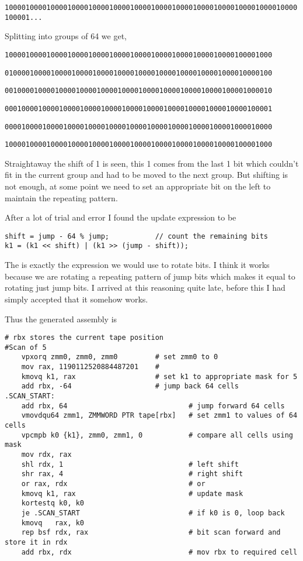 \documentclass[11pt,answers]{exam}
\begin{document}
\texttt{1000010000100001000010000100001000010000100001000010000100001000010000100001...}

\bigskip
Splitting into groups of 64 we get,

\texttt{1000010000100001000010000100001000010000100001000010000100001000}

\texttt{0100001000010000100001000010000100001000010000100001000010000100}

\texttt{0010000100001000010000100001000010000100001000010000100001000010}

\texttt{0001000010000100001000010000100001000010000100001000010000100001}

\texttt{0000100001000010000100001000010000100001000010000100001000010000}

\texttt{1000010000100001000010000100001000010000100001000010000100001000}


\bigskip
Straightaway the shift of 1 is seen, this 1 comes from the last 1 bit which couldn't fit in the current group and had to be moved to the next group. But shifting is not enough, at some point we need to set an appropriate bit on the left to maintain the repeating pattern.

\bigskip
After a lot of trial and error I found the update expression to be
\begin{verbatim}
shift = jump - 64 % jump;           // count the remaining bits
k1 = (k1 << shift) | (k1 >> (jump - shift));
\end{verbatim}

The is exactly the expression we would use to rotate bits. I think it works because we are rotating a repeating pattern of jump bits which makes it equal to rotating just jump bits. I arrived at this reasoning quite late, before this I had simply accepted that it somehow works.

Thus the generated assembly is
	{\renewcommand\fcolorbox[4][]{\textcolor{cyan}{\strut#4}}
		\begin{verbatim}
# rbx stores the current tape position
#Scan of 5
	vpxorq zmm0, zmm0, zmm0         # set zmm0 to 0
	mov rax, 1190112520884487201    # 
	kmovq k1, rax                   # set k1 to appropriate mask for 5
	add rbx, -64                    # jump back 64 cells
.SCAN_START:
	add rbx, 64                             # jump forward 64 cells
	vmovdqu64 zmm1, ZMMWORD PTR tape[rbx]   # set zmm1 to values of 64 cells
	vpcmpb k0 {k1}, zmm0, zmm1, 0           # compare all cells using mask
	mov rdx, rax                            
	shl rdx, 1                              # left shift
	shr rax, 4                              # right shift
	or rax, rdx                             # or
	kmovq k1, rax                           # update mask
	kortestq k0, k0
	je .SCAN_START                          # if k0 is 0, loop back
	kmovq   rax, k0                         
	rep bsf rdx, rax                        # bit scan forward and store it in rdx 
	add rbx, rdx                            # mov rbx to required cell

\end{verbatim}
	}
\pagebreak
\end{document}
